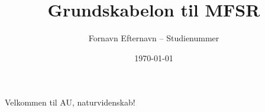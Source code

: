 \documentclass[a4paper,oneside,article]{memoir}
\begin{document}
\author{Fornavn Efternavn -- Studienummer}
\title{Grundskabelon til MFSR}
\date{\today}
\maketitle   %

Velkommen til AU, naturvidenskab!
\end{document}
